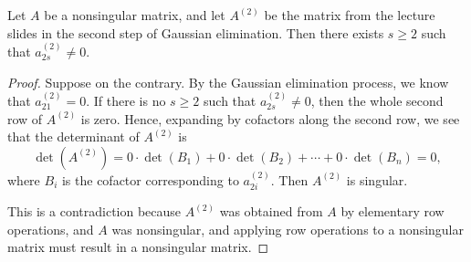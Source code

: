 \documentclass{homework}
\begin{document}
	\maketitle
	
	\question
	\newcommand{\atwo}{A^{(2)}}
	Let $A$ be a nonsingular matrix, and let $\atwo$ be the matrix from the lecture slides in the second step of Gaussian elimination. Then there exists $s \ge 2$ such that $a_{2s}^{(2)} \ne 0$.
	\begin{proof}
		Suppose on the contrary. By the Gaussian elimination process, we know that $a_{21}^{(2)} = 0$. If there is no $s \ge 2$ such that $a_{2s}^{(2)} \ne 0$, then the whole second row of $\atwo$ is zero. Hence, expanding by cofactors along the second row, we see that the determinant of $\atwo$ is
		\begin{equation}
			\det\left(\atwo\right) = 0\cdot\det(B_1) + 0\cdot\det(B_2) + \cdots +0\cdot\det(B_n) = 0,
		\end{equation}
		where $B_i$ is the cofactor corresponding to $a^{(2)}_{2i}$. Then $\atwo$ is singular.
		
		This is a contradiction because $\atwo$ was obtained from $A$ by elementary row operations, and $A$ was nonsingular, and applying row operations to a nonsingular matrix must result in a nonsingular matrix.
	\end{proof}
	
	\question
\end{document}
